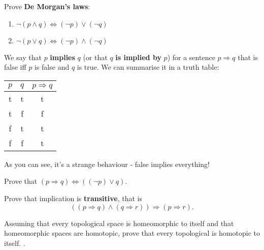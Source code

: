 \begin{exercise}
  Prove \textbf{De Morgan's laws}:
  \begin{enumerate}
    \item $\neg (p\wedge q) \Leftrightarrow (\neg p)\vee (\neg q)$
    \item $\neg (p\vee q) \Leftrightarrow (\neg p)\wedge (\neg q)$
  \end{enumerate}
\end{exercise}

\begin{definition}
  We say that $p$ \textbf{implies} $q$ (or that $q$ \textbf{is implied by} $p$) for a sentence $p\Rightarrow q$ that is false iff $p$ is false and $q$ is true.
  We can summarise it in a truth table:
  \begin{center}
    \begin{tabular}{ c  c  c }
      $p$ & $q$ & $p\Rightarrow q$ \\
      \hline
      t  &  t &        t     \\
      t  &  f &        f     \\
      f  &  t &        t     \\
      f  &  f &        t     \\
    \end{tabular}
  \end{center}
  As you can see, it's a strange behaviour - false implies everything!
\end{definition}

\begin{exercise}
  Prove that $(p\Rightarrow q)\Leftrightarrow ((\neg p) \vee q)$. 
\end{exercise}

\begin{exercise}
  Prove that implication is \textbf{transitive}, that is $$((p\Rightarrow q)\wedge (q\Rightarrow r)) \Rightarrow (p\Rightarrow r).$$
\end{exercise}

\begin{exercise}
  Assuming that every topological space is homeomorphic to itself and that homeomorphic spaces are homotopic, prove that every topological is homotopic to itself. .
\end{exercise}

